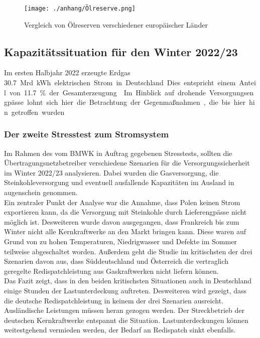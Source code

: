 	\begin{figure}[H]
		\centering
		\texttt{[image: ./anhang/Ölreserve.png]}
		\caption{Vergleich von Ölreserven verschiedener europäischer Länder}
		\label{Abb. Strategische Ölreserve} \cite{IEA_Ölreserven}
	\end{figure}
		
		
	\subsection{Kapazitätssituation für den Winter 2022/23}
	Im ersten Halbjahr 2022 erzeugte Erdgas \SI{30,7} Mrd. {kWh} elektrischen Strom in Deutschland. Dies entspricht einem Anteil von \SI{11,7}{\percent} der Gesamterzeugung.\cite{Stromproduktion_Erdgas} Im Hinblick auf drohende Versorgungsengpässe lohnt sich hier die Betrachtung der Gegenmaßnahmen, die bis hier hin getroffen wurden. \\
	
		\subsubsection{Der zweite Stresstest zum Stromsystem}
		Im Rahmen des vom BMWK in Auftrag gegebenen Stresstests, sollten die Übertragungsnetzbetreiber verschiedene Szenarien für die Versorgungssicherheit im Winter 2022/23 analysieren. Dabei wurden die Gasversorgung, die Steinkohleversorgung und eventuell ausfallende Kapazitäten im Ausland in augenschein genommen.\\
		
		Ein zentraler Punkt der Analyse war die Annahme, dass Polen keinen Strom exportieren kann, da die Versorgung mit Steinkohle durch Lieferengpässe nicht möglich ist. Desweiteren wurde davon ausgegangen, dass Frankreich bis zum Winter nicht alle Kernkraftwerke an den Markt bringen kann. Diese waren auf Grund von zu hohen Temperaturen, Niedrigwasser und Defekte im Sommer teilweise abgeschaltet worden. Außerdem geht die Studie im kritischsten der drei Szenarien davon aus, dass Süddeutschland und Österreich die vertraglich geregelte Redispatchleistung aus Gaskraftwerken nicht liefern können. \\
		
		Das Fazit zeigt, dass in den beiden kritischsten Situationen auch in Deutschland einige Stunden der Lastunterdeckung auftreten. Desweiteren wird gezeigt, dass die deutsche Redispatchleistung in keinem der drei Szenarien ausreicht. Ausländische Leistungen müssen heran gezogen werden. Der Streckbetrieb der deutschen Kernkraftwerke entspannt die Situation. Lastunterdeckungen können weitestgehend vermieden werden, der Bedarf an Redispatch sinkt ebenfalls.\cite{Stresstest} \\
		
